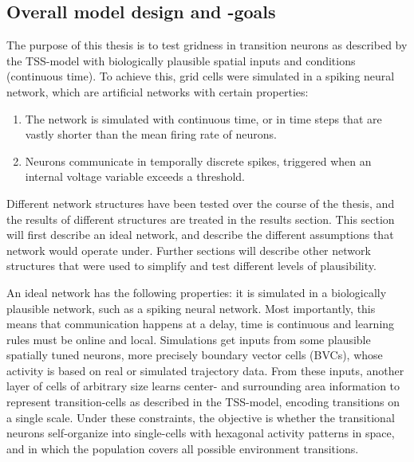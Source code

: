 \documentclass{article}
\begin{document}
    \subsection{Overall model design and -goals}The purpose of this thesis is to test gridness in transition neurons as described by the TSS-model with biologically plausible spatial inputs and conditions (continuous time). To achieve this, grid cells were simulated in a spiking neural network, which are artificial networks with certain properties:
    \begin{enumerate}
        \item The network is simulated with continuous time, or in time steps that are vastly shorter than the mean firing rate of neurons.
        \item Neurons communicate in temporally discrete spikes, triggered when an internal voltage variable exceeds a threshold.
    \end{enumerate}
    
    Different network structures have been tested over the course of the thesis, and the results of different structures are treated in the results section. This section will first describe an ideal network, and describe the different assumptions that network would operate under. Further sections will describe other network structures that were used to simplify and test different levels of plausibility.

    An ideal network has the following properties: it is simulated in a biologically plausible network, such as a spiking neural network. Most importantly, this means that communication happens at a delay, time is continuous and learning rules must be online and local. Simulations get inputs from some plausible spatially tuned neurons, more precisely boundary vector cells (BVCs), whose activity is based on real or simulated trajectory data. From these inputs, another layer of cells of arbitrary size learns center- and surrounding area information to represent transition-cells as described in the TSS-model, encoding transitions on a single scale. Under these constraints, the objective is whether the transitional neurons self-organize into single-cells with hexagonal activity patterns in space, and in which the population covers all possible environment transitions.
\end{document}
